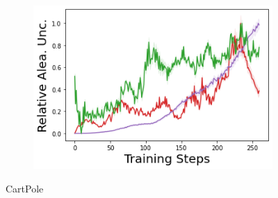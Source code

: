 \begin{figure}
\begin{subfigure}{.24\textwidth}
    \end{subfigure}
    \begin{subfigure}{.24\textwidth}
        \includegraphics[width=\textwidth]{sections/011_icml2022/resources/cartpole-training_aleatoric_ucertainty-training-model.png}  
    \end{subfigure}
    \vspace{-3mm}
    \caption*{CartPole}
    \vspace{2mm}
    

\end{figure}

